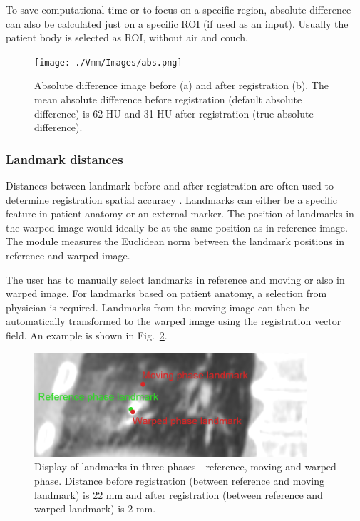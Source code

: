 To save computational time or to focus on a specific region, absolute difference can also be calculated just on a specific ROI (if used as an input). Usually the patient body is selected as ROI, without air and couch.


\begin{figure}[H]
	\begin{center}		
		\texttt{[image: ./Vmm/Images/abs.png]}
		\caption{Absolute difference image before (a) and after registration (b). The mean absolute difference before registration (default absolute difference) is 62 HU and 31 HU after registration (true absolute difference).}
		\label{absDiff}
	\end{center}
\end{figure}


\subsubsection{Landmark distances}

Distances between landmark before and after registration are often used to determine registration spatial accuracy \cite{Castillo2009}. 
Landmarks can either be a specific feature in patient anatomy or an external marker. The position of landmarks in the warped image would ideally 
be at the same position as in reference image. The module measures the Euclidean norm between the landmark positions in reference and warped image.

The user has to manually select landmarks in reference and moving or also in warped image. For landmarks based on patient anatomy, a selection from physician is required. 
Landmarks from the moving image can then be automatically transformed to the warped image using the registration vector field. An example is shown in Fig.~\ref{landmark}.

\begin{figure}[H]
\begin{center}
\includegraphics[width=0.9\textwidth]{./Vmm/Images/landmark.png}
\caption{Display of landmarks in three phases - reference, moving and warped phase. Distance before registration (between reference and moving landmark) is 22 mm and after registration
(between reference and warped landmark) is 2 mm.}
\label{landmark}
\end{center}
\end{figure}

